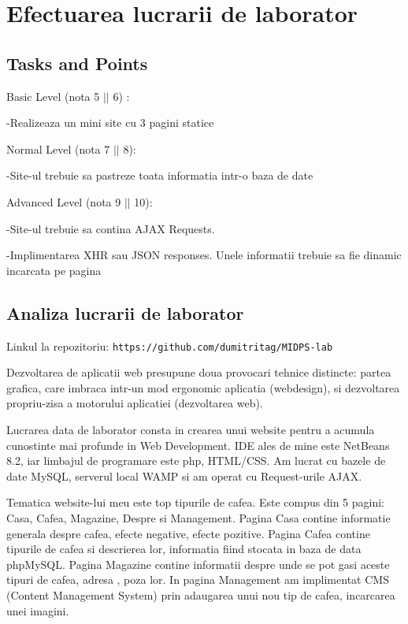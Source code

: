 \section{Efectuarea lucrarii de laborator}



\subsection{Tasks and Points}



Basic Level (nota 5 $||$ 6) : 

-Realizeaza un mini site cu 3 pagini statice


Normal Level (nota 7 $||$ 8):

-Site-ul trebuie sa pastreze toata informatia intr-o baza de date


Advanced Level (nota 9 $||$ 10):

-Site-ul trebuie sa contina AJAX Requests.

-Implimentarea XHR sau JSON responses. Unele informatii trebuie sa fie dinamic incarcata pe pagina

\subsection{Analiza lucrarii de laborator}


Linkul la repozitoriu: \texttt{https://github.com/dumitritag/MIDPS-lab}


Dezvoltarea de aplicatii web presupune doua provocari tehnice distincte: partea grafica, care imbraca intr-un mod ergonomic aplicatia (webdesign), si dezvoltarea propriu-zisa a motorului aplicatiei (dezvoltarea web).

Lucrarea data de laborator consta in crearea unui website pentru a acumula cunostinte mai profunde in Web Development. IDE ales de mine este NetBeans 8.2, iar limbajul de programare este php, HTML/CSS. Am lucrat cu bazele de date MySQL, serverul local WAMP si am operat cu Request-urile AJAX. 

Tematica website-lui meu este top tipurile de cafea. Este compus din 5 pagini: Casa, Cafea, Magazine, Despre si Management. Pagina Casa contine informatie generala despre cafea, efecte negative, efecte pozitive. Pagina Cafea contine tipurile de cafea si descrierea lor, informatia fiind stocata in baza de data phpMySQL. Pagina Magazine contine informatii despre unde se pot gasi aceste tipuri de cafea, adresa , poza lor. In pagina Management am implimentat CMS (Content Management System) prin adaugarea unui nou tip de cafea, incarcarea unei imagini. 

